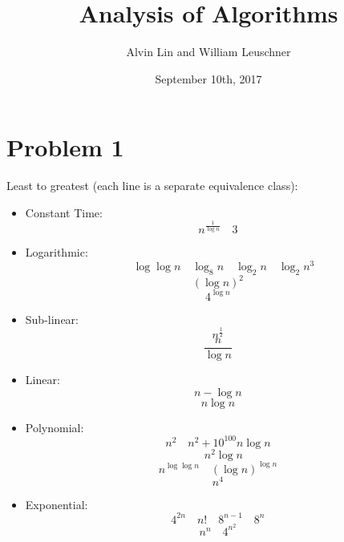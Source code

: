 \documentclass[letterpaper, 12pt]{math}
\title{Analysis of Algorithms}
\author{Alvin Lin and William Leuschner}
\date{September 10th, 2017}
\begin{document}
\maketitle

\section*{Problem 1}
Least to greatest (each line is a separate equivalence class):
\begin{itemize}
  \item Constant Time:
  \[ n^{\frac{1}{\log n}} \quad 3 \]
  \item Logarithmic:
  \[ \quad \log\log n \quad \log_8 n \quad \log_2 n \quad \log_2 n^3 \]
  \[ (\log n)^2 \]
  \[ 4^{\log n} \]
  \item Sub-linear:
  \[ n^{\frac{1}{2}} \]
  \[ \frac{n}{\log n} \]
  \item Linear:
  \[ n-\log n \]
  \[ n\log n \]
  \item Polynomial:
  \[ n^2 \quad n^2+10^{100}n\log n \]
  \[ \quad n^2\log n \]
  \[ n^{\log\log n} \quad (\log n)^{\log n} \]
  \[ n^4 \]
  \item Exponential:
  \[ 4^{2n} \quad n! \quad 8^{n-1} \quad 8^n \]
  \[ n^n\quad 4^{n^2} \]
\end{itemize}
\end{document}
